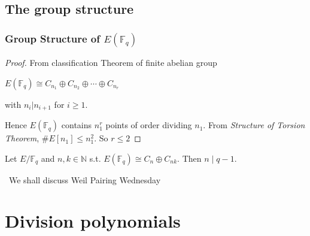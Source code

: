 \documentclass[10pt,handout]{beamer} %
\newcommand{\F}{\mathbb F}
\theoremstyle{definition}
\begin{document}
\subsection{The group structure}
\begin{frame}\frametitle{Group Structure of $E(\F_q)$}

\pause

\begin{proof}
From classification Theorem of finite abelian group\\
\centerline{$E(\F_q)\cong  C_{n_1}\oplus C_{n_2}\oplus\cdots\oplus C_{n_r}$}
with $n_i|n_{i+1}$ for $i\ge1$.\pause

Hence $E(\F_q)$ contains $n_1^r$ points of order dividing $n_1$. From
\emph{Structure of Torsion Theorem}, $\#E[n_1]\le n_1^2$.
So $r\le2$\end{proof}\pause

\begin{theorem}  Let $E/\F_q$ and $n,k\in\mathbb N$ s.t.
$E(\F_q)\cong C_n\oplus C_{nk}.$
Then $n\mid q-1$.
\end{theorem}\pause

\ \hfil \alert{We shall discuss Weil Pairing Wednesday}
\end{frame}


\section{Division polynomials}
\end{document}
